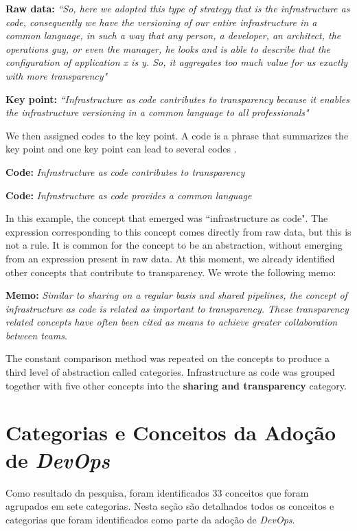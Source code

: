 \textbf{Raw data:} \textit{``So, here we adopted this type of strategy that is
the infrastructure as code, consequently we have the versioning of our entire
infrastructure in a common language, in such a way that any person, a
developer, an architect, the operations guy, or even the manager, he looks and
is able to describe that the configuration of application x is y. So, it
aggregates too much value for us exactly with more transparency"}

\textbf{Key point:} \textit{``Infrastructure as code contributes to
transparency because it enables the infrastructure versioning in a common
language to all professionals"}

We then assigned codes to the key point. A code is a phrase that summarizes
the key point and one key point can lead to several codes \cite{hoda2017becoming}.

\textbf{Code:} \textit{Infrastructure as code contributes to transparency}

\textbf{Code:} \textit{Infrastructure as code provides a common language}

In this example, the concept that emerged was ``infrastructure as code". The
expression corresponding to this concept comes directly from raw data, but this
is not a rule. It is common for the concept to be an abstraction, without
emerging from an expression present in raw data.
At this moment, we already identified other concepts that
contribute to transparency. We wrote the following memo:

\textbf{Memo:} \textit{Similar to sharing on a regular basis and shared
pipelines, the concept of infrastructure as code is related as important to
transparency. These transparency related concepts have often been cited as
means to achieve greater collaboration between teams}.

The constant comparison method was repeated on the concepts to produce a third
level of abstraction called categories. Infrastructure as code was grouped
together with five other concepts into the \textbf{sharing and transparency} category.


\section{Categorias e Conceitos da Adoção de \textit{DevOps}}

Como resultado da pesquisa, foram identificados 33 conceitos que foram agrupados
em sete categorias. Nesta seção são detalhados todos os conceitos e categorias
que foram  identificados como parte da adoção de \textit{DevOps}.

